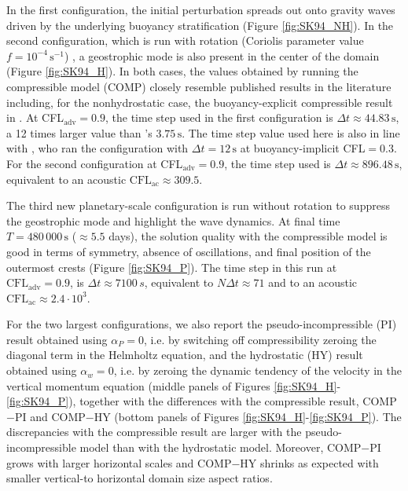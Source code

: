 \documentclass{ametsoc}
\theoremstyle{definition}
\newcommand{\dt}{\Delta t}
\begin{document}
In the first configuration, the initial perturbation spreads out onto gravity waves driven by the underlying buoyancy stratification (Figure \ref{fig:SK94_NH}). In the second configuration, which is run with rotation (Coriolis parameter value $f=10^{-4}\,\textrm{s}^{-1}$) , a geostrophic mode is also present in the center of the domain (Figure \ref{fig:SK94_H}). In both cases, the values obtained by running the compressible model (COMP) closely resemble published results in the literature including, for the nonhydrostatic case, the buoyancy-explicit compressible result in \cite{BenacchioEtAl2014}. At CFL$_\textrm{adv}=0.9$, the time step used in the first configuration is $\Delta t\approx44.83\,\textrm{s}$, a 12 times larger value than \cite{BenacchioEtAl2014}'s $3.75\,\textrm{s}$. The time step value used here is also in line with \cite{MelvinEtAl2018}, who ran the configuration with $\dt=12\,\textrm{s}$ at buoyancy-implicit CFL$=0.3$. For the second configuration at CFL$_\textrm{adv}=0.9$, the time step used is $\Delta t\approx896.48\,\textrm{s}$, equivalent to an acoustic $\mathrm{CFL}_{\mathrm{ac}}\approx309.5$.

The third new planetary-scale configuration is run without rotation to suppress the geostrophic mode and highlight the wave dynamics. At final time $T=480\,000\,\textrm{s}$ ($\approx5.5$ days), the solution quality with the compressible model is good in terms of symmetry, absence of oscillations, and final position of the outermost crests (Figure \ref{fig:SK94_P}). The time step in this run at $\mathrm{CFL}_\mathrm{adv} = 0.9$, is $\dt\approx7100\,s$, equivalent to $N \dt\approx71$ and to an acoustic $\mathrm{CFL}_\mathrm{ac}\approx2.4\cdot 10^3$.

For the two largest configurations, we also report the pseudo-incompressible (PI) result obtained using $\alpha_P=0$, i.e. by switching off compressibility zeroing the diagonal term in the Helmholtz equation, and the hydrostatic (HY) result obtained using $\alpha_w=0$, i.e. by zeroing the dynamic tendency of the velocity in the vertical momentum equation (middle panels of Figures \ref{fig:SK94_H}-\ref{fig:SK94_P}), together with the differences with the compressible result, COMP$-$PI and COMP$-$HY (bottom panels of Figures \ref{fig:SK94_H}-\ref{fig:SK94_P}). The discrepancies with the compressible result are larger with the pseudo-incompressible model than with the hydrostatic model. Moreover, COMP$-$PI grows with larger horizontal scales and COMP$-$HY shrinks as expected with smaller vertical-to horizontal domain size aspect ratios.
\end{document}
